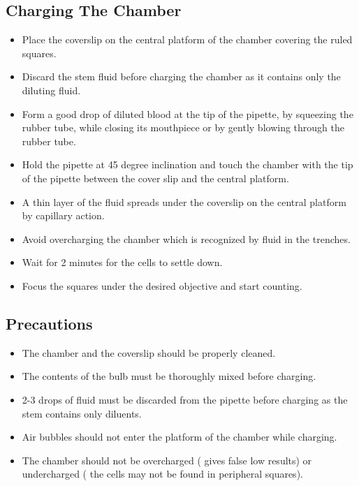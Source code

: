 \documentclass[a4paper,12pt]{book}
\begin{document}
	\subsection*{Charging The Chamber}
	\begin{itemize}

		\item{	 Place the coverslip on the central platform of the chamber covering the ruled squares.}
		\item{	 Discard the stem fluid before charging the chamber as it contains only the diluting fluid.}
		\item{	 Form a good drop of diluted blood at the tip of the pipette, by squeezing the rubber tube, while closing its mouthpiece or by gently blowing through the rubber tube.}
		\item{	 Hold the pipette at 45 degree inclination and touch the chamber with the  tip of the pipette between the cover slip and the central platform.}
		\item{	 A thin layer of the fluid spreads under the coverslip on the central  platform by capillary action.}
		\item{	 Avoid overcharging the chamber which is recognized by fluid in the  trenches.}
		\item{	 Wait for 2 minutes for the cells to settle down.}
		\item{	 Focus  the  squares  under  the  desired  objective  and  start  counting.}
	\end{itemize}


	\subsection*{Precautions}
	\begin{itemize}

		\item{	 The chamber and the coverslip should be properly cleaned.}
		\item{	 The contents of the bulb must be thoroughly mixed before charging.}
		\item{	 2-3 drops of fluid must be discarded from the pipette before charging as the stem contains only diluents.}
		\item{	 Air bubbles should not enter the platform of the chamber while charging.}
		\item{	 The chamber should not be overcharged ( gives false low results) or undercharged ( the cells may not be found in peripheral squares).}
	\end{itemize}
\end{document}
